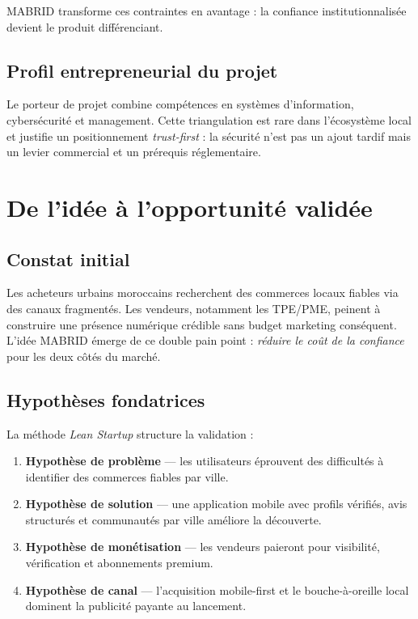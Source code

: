 MABRID transforme ces contraintes en avantage : la confiance institutionnalisée devient le produit différenciant.

\subsection{Profil entrepreneurial du projet}

Le porteur de projet combine compétences en systèmes d'information, cybersécurité et management. Cette triangulation est rare dans l'écosystème local et justifie un positionnement \emph{trust-first} : la sécurité n'est pas un ajout tardif mais un levier commercial et un prérequis réglementaire.


\section{De l'idée à l'opportunité validée}

\subsection{Constat initial}

Les acheteurs urbains moroccains recherchent des commerces locaux fiables via des canaux fragmentés. Les vendeurs, notamment les TPE/PME, peinent à construire une présence numérique crédible sans budget marketing conséquent. L'idée MABRID émerge de ce double pain point : \emph{réduire le coût de la confiance} pour les deux côtés du marché.

\subsection{Hypothèses fondatrices}

La méthode \emph{Lean Startup} \parencite{ries2011lean} structure la validation :
\begin{enumerate}
  \item \textbf{Hypothèse de problème} --- les utilisateurs éprouvent des difficultés à identifier des commerces fiables par ville.
  \item \textbf{Hypothèse de solution} --- une application mobile avec profils vérifiés, avis structurés et communautés par ville améliore la découverte.
  \item \textbf{Hypothèse de monétisation} --- les vendeurs paieront pour visibilité, vérification et abonnements premium.
  \item \textbf{Hypothèse de canal} --- l'acquisition mobile-first et le bouche-à-oreille local dominent la publicité payante au lancement.
\end{enumerate}

